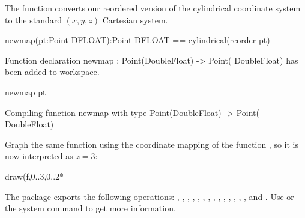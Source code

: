 \begin{xtc}
\begin{xtccomment}
The function  converts our reordered version of
the cylindrical coordinate system to the standard
$(x,y,z)$ Cartesian system.
\end{xtccomment}
\begin{spadsrc}
newmap(pt:Point DFLOAT):Point DFLOAT == cylindrical(reorder pt) 
\end{spadsrc}
\begin{MessageOutput}
   Function declaration newmap : Point(DoubleFloat) -> Point(
      DoubleFloat) has been added to workspace.
\end{MessageOutput}
\end{xtc}
\begin{xtc}
\begin{xtccomment}
\end{xtccomment}
\begin{spadsrc}
newmap pt 
\end{spadsrc}
\begin{MessageOutput}
   Compiling function newmap with type Point(DoubleFloat) -> Point(
      DoubleFloat) 
\end{MessageOutput}
\begin{TeXOutput}
\begin{fricasmath}{9}
%
\end{fricasmath}
\end{TeXOutput}
\end{xtc}
%
\begin{psXtc}
\begin{xtccomment}
Graph the same function  using the coordinate mapping of the function
, so it is now interpreted as
$z=3$:
\end{xtccomment}
\begin{spadsrc}
draw(f,0..3,0..2*%
\end{spadsrc}
\end{psXtc}

{\sloppy
The  package exports the following
operations:
,
,
,
,
,
,
,
,
,
,
,
,
,
, and
.
Use \Browse{} or the  system command
to get more information.

}

